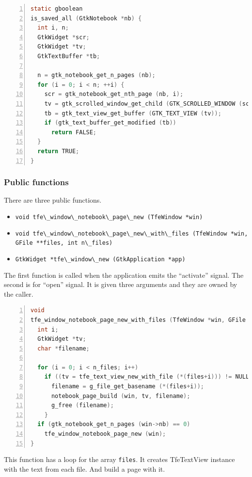 \begin{lstlisting}[language=C, numbers=left]
static gboolean
is_saved_all (GtkNotebook *nb) {
  int i, n;
  GtkWidget *scr;
  GtkWidget *tv;
  GtkTextBuffer *tb;

  n = gtk_notebook_get_n_pages (nb);
  for (i = 0; i < n; ++i) {
    scr = gtk_notebook_get_nth_page (nb, i);
    tv = gtk_scrolled_window_get_child (GTK_SCROLLED_WINDOW (scr));
    tb = gtk_text_view_get_buffer (GTK_TEXT_VIEW (tv));
    if (gtk_text_buffer_get_modified (tb))
      return FALSE;
  }
  return TRUE;
}
\end{lstlisting}

\subsubsection{Public functions}\label{public-functions}

There are three public functions.

\begin{itemize}
\tightlist
\item
  \passthrough{\lstinline!void tfe\_window\_notebook\_page\_new (TfeWindow *win)!}
\item
  \passthrough{\lstinline!void tfe\_window\_notebook\_page\_new\_with\_files (TfeWindow *win, GFile **files, int n\_files)!}
\item
  \passthrough{\lstinline!GtkWidget *tfe\_window\_new (GtkApplication *app)!}
\end{itemize}

The first function is called when the application emits the ``activate''
signal. The second is for ``open'' signal. It is given three arguments
and they are owned by the caller.

\begin{lstlisting}[language=C, numbers=left]
void
tfe_window_notebook_page_new_with_files (TfeWindow *win, GFile **files, int n_files) {
  int i;
  GtkWidget *tv;
  char *filename;

  for (i = 0; i < n_files; i++)
    if ((tv = tfe_text_view_new_with_file (*(files+i))) != NULL) {
      filename = g_file_get_basename (*(files+i));
      notebook_page_build (win, tv, filename);
      g_free (filename);
    }
  if (gtk_notebook_get_n_pages (win->nb) == 0)
    tfe_window_notebook_page_new (win);
}
\end{lstlisting}

This function has a loop for the array \passthrough{\lstinline!files!}.
It creates TfeTextView instance with the text from each file. And build
a page with it.


